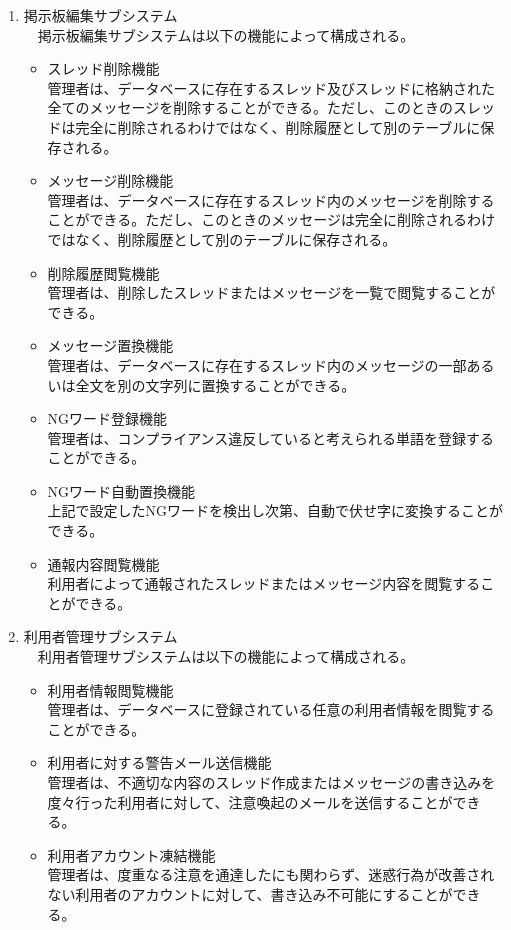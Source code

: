\documentclass[a4j]{jarticle}
\begin{document}
\begin{enumerate}
  \item 掲示板編集サブシステム\\
  　掲示板編集サブシステムは以下の機能によって構成される。
  \begin{itemize}
    \item スレッド削除機能\\
    管理者は、データベースに存在するスレッド及びスレッドに格納された全てのメッセージを削除することができる。ただし、このときのスレッドは完全に削除されるわけではなく、削除履歴として別のテーブルに保存される。
    \item メッセージ削除機能\\
    管理者は、データベースに存在するスレッド内のメッセージを削除することができる。ただし、このときのメッセージは完全に削除されるわけではなく、削除履歴として別のテーブルに保存される。
    \item 削除履歴閲覧機能\\
    管理者は、削除したスレッドまたはメッセージを一覧で閲覧することができる。
    \item メッセージ置換機能\\
    管理者は、データベースに存在するスレッド内のメッセージの一部あるいは全文を別の文字列に置換することができる。
    \item NGワード登録機能\\
    管理者は、コンプライアンス違反していると考えられる単語を登録することができる。
    \item NGワード自動置換機能\\
    上記で設定したNGワードを検出し次第、自動で伏せ字に変換することができる。
    \item 通報内容閲覧機能\\
    利用者によって通報されたスレッドまたはメッセージ内容を閲覧することができる。\\
  \end{itemize}


  \item 利用者管理サブシステム\\
  　利用者管理サブシステムは以下の機能によって構成される。
  \begin{itemize}
    \item 利用者情報閲覧機能\\
    管理者は、データベースに登録されている任意の利用者情報を閲覧することができる。
    \item 利用者に対する警告メール送信機能\\
    管理者は、不適切な内容のスレッド作成またはメッセージの書き込みを度々行った利用者に対して、注意喚起のメールを送信することができる。
    \item 利用者アカウント凍結機能\\
    管理者は、度重なる注意を通達したにも関わらず、迷惑行為が改善されない利用者のアカウントに対して、書き込み不可能にすることができる。\\
  \end{itemize}



\end{enumerate}
\end{document}
